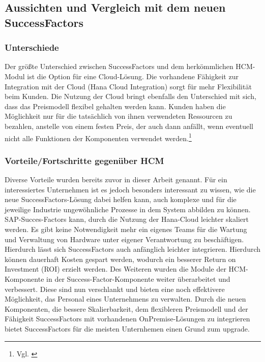 \subsection{Aussichten und Vergleich mit dem neuen SuccessFactors}
\subsubsection{Unterschiede}
Der größte Unterschied zwischen SuccessFactors und dem herkömmlichen HCM-Modul ist die Option für eine Cloud-Lösung.
Die vorhandene Fähigkeit zur Integration mit der Cloud (Hana Cloud Integration) sorgt für mehr Flexibilität beim Kunden.
Die Nutzung der Cloud bringt ebenfalls den Unterschied mit sich, dass das Preismodell flexibel gehalten werden kann.
Kunden haben die Möglichkeit nur für die tatsächlich von ihnen verwendeten Ressourcen zu bezahlen, anstelle von einem festen Preis, der auch dann anfällt, wenn eventuell nicht alle Funktionen der Komponenten verwendet werden.\footnote{Vgl. \cite{SAPSE2024i}}

\subsubsection{Vorteile/Fortschritte gegenüber HCM}
Diverse Vorteile wurden bereits zuvor in dieser Arbeit genannt.
Für ein interessiertes Unternehmen ist es jedoch besonders interessant zu wissen, wie die neue SuccessFactors-Lösung dabei helfen kann, auch komplexe und für die jeweilige Industrie ungewöhnliche Prozesse in dem System abbilden zu können.
SAP-Succes-Factors kann, durch die Nutzung der Hana-Cloud leichter skaliert werden.
Es gibt keine Notwendigkeit mehr ein eigenes Teams für die Wartung und Verwaltung von Hardware unter eigener Verantwortung zu beschäftigen.
Hierdurch lässt sich SuccessFactors auch anfänglich leichter integrieren. Hierdurch können dauerhaft Kosten gespart werden, wodurch ein besserer Return on Investment (ROI) erzielt werden.
Des Weiteren wurden die Module der HCM-Komponente in der Success-Factor-Komponente weiter überarbeitet und verbessert.
Diese sind nun verschlankt und bieten eine noch effektivere Möglichkeit, das Personal eines Unternehmens zu verwalten.
Durch die neuen Komponenten, die bessere Skalierbarkeit, dem flexibleren Preismodell und der Fähigkeit SuccessFactors mit vorhandenen OnPremise-Lösungen zu integrieren bietet SuccessFactors für die meisten Unternhemen einen Grund zum upgrade.